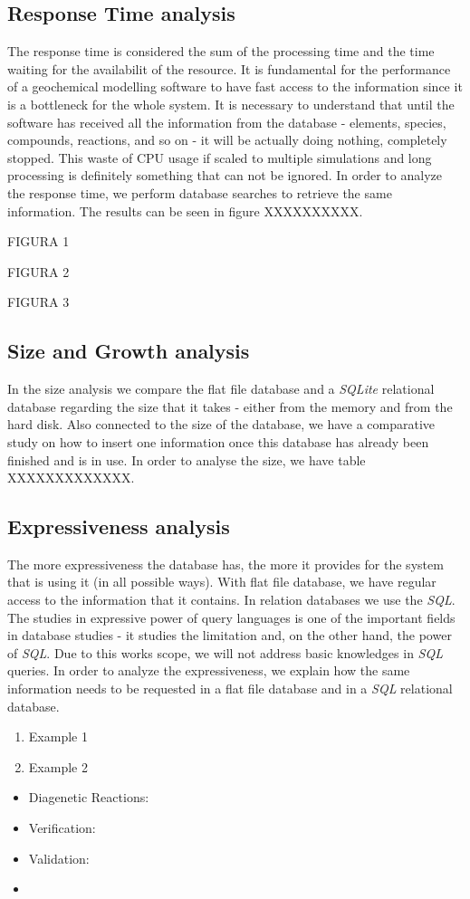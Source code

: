 \subsection{Response Time analysis}
The response time is considered the sum of the processing time and the time waiting for the availabilit of the resource. It is fundamental for the performance of a geochemical modelling software to have fast access to the information since it is a bottleneck for the whole system. 
It is necessary to understand that until the software has received all the information from the database - elements, species, compounds, reactions, and so on - it will be actually doing nothing, completely stopped. This waste of CPU usage if scaled to multiple simulations and long processing is definitely something that can not be ignored. 
In order to analyze the response time, we perform database searches to retrieve the same information. The results can be seen in figure XXXXXXXXXX.

FIGURA 1 

FIGURA 2

FIGURA 3

\subsection{Size and Growth analysis}
In the size analysis we compare the flat file database and a \emph{SQLite} relational database regarding the size that it takes - either from the memory and from the hard disk. Also connected to the size of the database, we have a comparative study on how to insert one information once this database has already been finished and is in use.
In order to analyse the size, we have table XXXXXXXXXXXXX.

\subsection{Expressiveness analysis}
The more expressiveness the database has, the more it provides for the system that is using it (in all possible ways). With flat file database, we have regular access to the information that it contains. In relation databases we use the \emph{SQL}. The studies in expressive power of query languages is one of the important fields in database studies - it studies the limitation and, on the other hand, the power of \emph{SQL}. Due to this works scope, we will not address basic knowledges in \emph{SQL} queries. 
In order to analyze the expressiveness, we explain how the same information needs to be requested in a flat file database and in a \emph{SQL} relational database. 

\begin{enumerate}
    \item Example 1
    \item Example 2
\end{enumerate}


\begin{itemize}
    \item Diagenetic Reactions:
    \item Verification: 
    \item Validation: 
    \item 
\end{itemize}